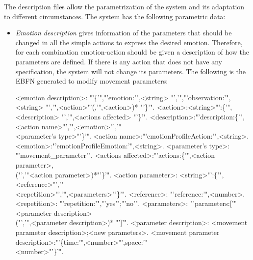 The description files allow the parametrization of the system and its adaptation to different circumstances.  The system has the following parametric data:

\begin{itemize}

	\item \textit{Emotion description} gives information of the parameters that should be changed in all the simple actions to express the desired emotion. Therefore, for each combination emotion-action should be given a description of how the parameters are defined. If there is any action that does not have any specification, the system will not change its parameters. The following is the EBFN generated to modify movement parameters: 
\begin{grammar}
<emotion description>: "'\{'","'emotion:'",<string> "','","'observation:'",<string> "','",<action>"'(,'",<action>)* "'\}'".
<action>:<string>"':\{'",<description> "','",<actions affected> "'\}'".
<description>:"'description:\{'",<action name>"','",<emotion>"','"\\
<parameter's type>"'\}'".
<action name>:"'emotionProfileAction:'",<string>.
<emotion>:"'emotionProfileEmotion:'",<string>.
<parameter's type>: "'movement\_parameter'".
<actions affected>:"'actions:\{'",<action parameter>,\\("','"<action parameter>)*"'\}'".
<action parameter>: <string>"':\{'",<reference>"','"\\<repetition>"','",<parameters>"'\}'".
<reference>: "'reference:'",<number>.
<repetition>: "'repetition:'","'yes'";"'no'".
<parameters>: "'parameters:['" <parameter description>\\("','",<parameter description>)* "']'".
<parameter description>: <movement parameter description>;<new parameters>.
<movement parameter description>:"'\{time:'",<number>"',space:'"\\<number>"'\}'".
\end{grammar}


\end{itemize}
